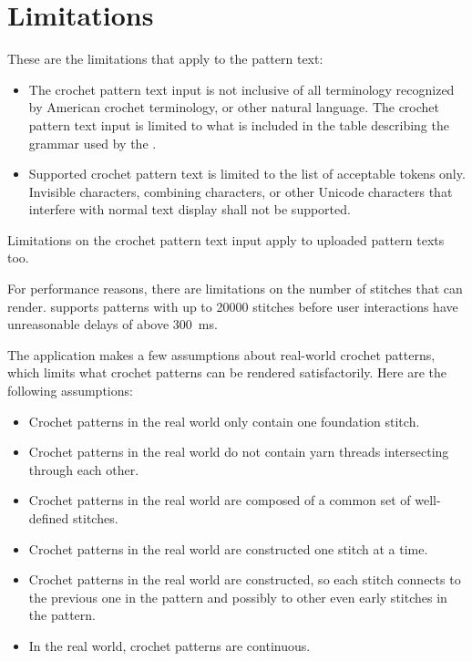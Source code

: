 \documentclass[main.tex]{subfiles}
\begin{document}
\chapter{Limitations}\label{chp:limitations}

These are the limitations that apply to the pattern text:
\begin{itemize}
\item The crochet pattern text input is not inclusive of all terminology recognized by American crochet terminology, or other natural language. The crochet pattern text input is limited to what is included in the table describing the grammar used by the \PTI.
\item Supported crochet pattern text is limited to the list of acceptable tokens only. Invisible characters, combining characters, or other Unicode characters that interfere with normal text display shall not be supported.
\end{itemize}

Limitations on the crochet pattern text input apply to uploaded pattern texts too.

For performance reasons, there are limitations on the number of stitches that \CC{} can render. \CC{} supports patterns with up to \num{20000} stitches before user interactions have unreasonable delays of above \qty{300}{ms}. 

The \CC{} application makes a few assumptions about real-world crochet patterns, which limits what crochet patterns can be rendered satisfactorily. Here are the following assumptions:

\begin{itemize}
\item Crochet patterns in the real world only contain one foundation stitch.
\item Crochet patterns in the real world do not contain yarn threads intersecting through each other.
\item Crochet patterns in the real world are composed of a common set of well-defined stitches.
\item Crochet patterns in the real world are constructed one stitch at a time.
\item Crochet patterns in the real world are constructed, so each stitch connects to the previous one in the pattern and possibly to other even early stitches in the pattern.
\item In the real world, crochet patterns are continuous.
\end{itemize}
\end{document}
